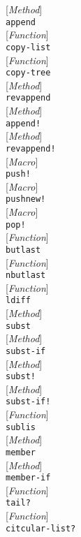 \documentclass[10pt]{book}
\newenvironment{defother}[2]{[\textit{#1}]\\\texttt{#2}}{\\}
\newenvironment{defun}[1]{\begin{defother}{Function}{#1}}{\end{defother}}
\newenvironment{defmethod}[1]{\begin{defother}{Method}{#1}}{\end{defother}}
\newenvironment{defmacro}[1]{\begin{defother}{Macro}{#1}}{\end{defother}}
\begin{document}
\begin{defmethod}{append}\end{defmethod}
\begin{defun}{copy-list}\end{defun}%
\begin{defun}{copy-tree}\end{defun}
\begin{defmethod}{revappend}\end{defmethod}
\begin{defmethod}{append!}\end{defmethod}
\begin{defmethod}{revappend!}\end{defmethod}
\begin{defmacro}{push!}\end{defmacro} %
\begin{defmacro}{pushnew!}\end{defmacro} %
\begin{defmacro}{pop!}\end{defmacro}
\begin{defun}{butlast}\end{defun}%
\begin{defun}{nbutlast}\end{defun}
\begin{defun}{ldiff}\end{defun}
%
\begin{defmethod}{subst}\end{defmethod}
\begin{defmethod}{subst-if}\end{defmethod}
%
\begin{defmethod}{subst!}\end{defmethod}
\begin{defmethod}{subst-if!}\end{defmethod}
%
\begin{defun}{sublis}\end{defun}
\begin{defmethod}{member}\end{defmethod}
\begin{defmethod}{member-if}\end{defmethod}
\begin{defun}{tail?}\end{defun}%
\begin{defun}{citcular-list?}\end{defun}
\end{document}
